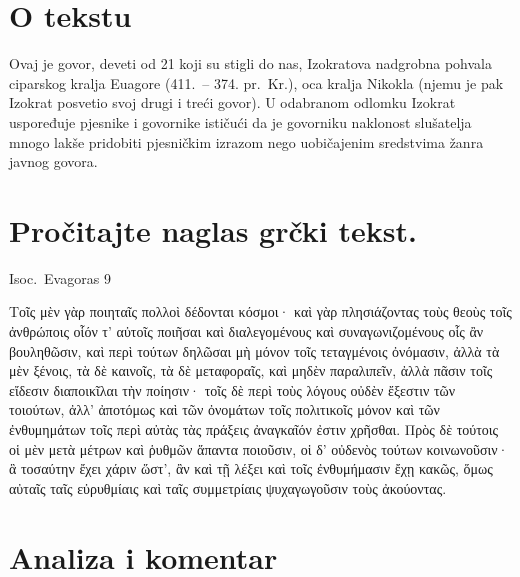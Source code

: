 

\section*{O tekstu}

Ovaj je govor, deveti od 21 koji su stigli do nas, Izokratova nadgrobna pohvala ciparskog kralja Euagore (411.\ – 374. pr.~Kr.), oca kralja Nikokla (njemu je pak Izokrat posvetio svoj drugi i treći govor). U odabranom odlomku Izokrat uspoređuje pjesnike i govornike ističući da je govorniku naklonost slušatelja mnogo lakše pridobiti pjesničkim izrazom nego uobičajenim sredstvima žanra javnog govora.


\section*{Pročitajte naglas grčki tekst.}


Isoc.\ Evagoras 9

\medskip

{\large
\begin{greek}
\noindent Τοῖς μὲν γὰρ ποιηταῖς πολλοὶ δέδονται κόσμοι· καὶ γὰρ πλησιάζοντας τοὺς θεοὺς τοῖς ἀνθρώποις οἷόν τ' αὐτοῖς ποιῆσαι καὶ διαλεγομένους καὶ συναγωνιζομένους οἷς ἂν βουληθῶσιν, καὶ περὶ τούτων δηλῶσαι μὴ μόνον τοῖς τεταγμένοις ὀνόμασιν, ἀλλὰ τὰ μὲν ξένοις, τὰ δὲ καινοῖς, τὰ δὲ μεταφοραῖς, καὶ μηδὲν παραλιπεῖν, ἀλλὰ πᾶσιν τοῖς εἴδεσιν διαποικῖλαι τὴν ποίησιν· τοῖς δὲ περὶ τοὺς λόγους οὐδὲν ἔξεστιν τῶν τοιούτων, ἀλλ' ἀποτόμως καὶ τῶν ὀνομάτων τοῖς πολιτικοῖς μόνον καὶ τῶν ἐνθυμημάτων τοῖς περὶ αὐτὰς τὰς πράξεις ἀναγκαῖόν ἐστιν χρῆσθαι. Πρὸς δὲ τούτοις οἱ μὲν μετὰ μέτρων καὶ ῥυθμῶν ἅπαντα ποιοῦσιν, οἱ δ' οὐδενὸς τούτων κοινωνοῦσιν· ἃ τοσαύτην ἔχει χάριν ὥστ', ἂν καὶ τῇ λέξει καὶ τοῖς ἐνθυμήμασιν ἔχῃ κακῶς, ὅμως αὐταῖς ταῖς εὐρυθμίαις καὶ ταῖς συμμετρίαις ψυχαγωγοῦσιν τοὺς ἀκούοντας.

\end{greek}

}

\section*{Analiza i komentar}

